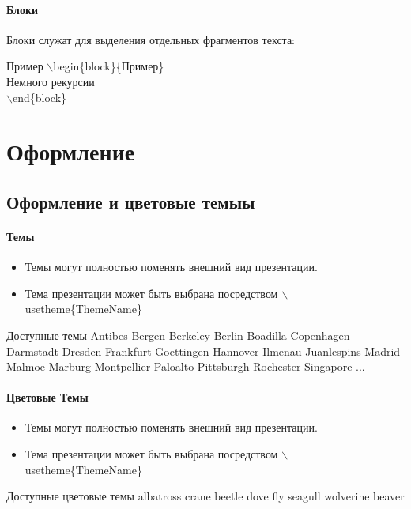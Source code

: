 \documentclass[ignorenonframetext]{beamer}
\begin{document}
\begin{frame}
\frametitle{Блоки}
Блоки служат для выделения отдельных фрагментов текста:

\begin{block}{Пример}
$\backslash$begin\{block\}\{Пример\}\\
Немного рекурсии\\
$\backslash$end\{block\}\\
\end{block}
\end{frame}

\chapter{Оформление}
\section{Оформление и цветовые темыы}

\begin{frame}
\frametitle{Темы}
\begin{itemize}
\item Темы могут полностью поменять внешний вид
презентации.
\item Тема презентации может быть выбрана посредством
$\backslash$usetheme\{ThemeName\}
\end{itemize}

\begin{block}{Доступные темы}
Antibes Bergen Berkeley Berlin Boadilla Copenhagen Darmstadt
Dresden Frankfurt Goettingen Hannover Ilmenau Juanlespins
Madrid Malmoe Marburg Montpellier Paloalto Pittsburgh
Rochester Singapore ...
\end{block}
\end{frame}

\begin{frame}
\frametitle{Цветовые Темы}
\begin{itemize}
\item  Темы могут полностью поменять внешний вид
презентации.
\item   Тема презентации может быть выбрана посредством
$\backslash$usetheme\{ThemeName\}

\end{itemize}

\begin{block}{Доступные цветовые темы}
albatross crane beetle dove fly seagull wolverine beaver
\end{block}
\end{frame}
\end{document}
